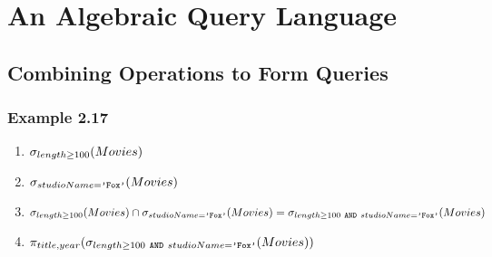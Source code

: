 \documentclass{bdad}
\begin{document}
\section{An Algebraic Query Language}
\setcounter{section}{9}
\subsection{Combining Operations to Form Queries}
\subsubsection{Example 2.17}
\begin{enumerate}
    \item $\sigma_{length \geq 100}({Movies})$
    \item $\sigma_{studioName=\texttt{'Fox'}}({Movies})$
    \item $\sigma_{length \geq 100}({Movies}) \cap \sigma_{studioName=\texttt{'Fox'}}({Movies}) = \sigma_{length \geq 100 ~\texttt{AND}~ studioName=\texttt{'Fox'}}({Movies})$
    \item $\pi_{title, year}({\sigma_{length \geq 100 ~\texttt{AND}~ studioName=\texttt{'Fox'}}({Movies})})$
\end{enumerate}
\end{document}
